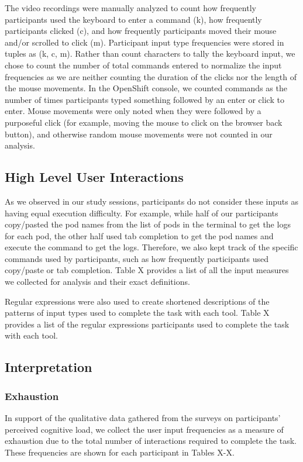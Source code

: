 \documentclass[11pt, oneside]{article}   	%
\begin{document}
The video recordings were manually analyzed to count how frequently participants used the keyboard to enter a command (k), how frequently participants clicked (c), and how frequently participants moved their mouse and/or scrolled to click (m). Participant input type frequencies were stored in tuples as (k, c, m). Rather than count characters to tally the keyboard input, we chose to count the number of total commands entered to normalize the input frequencies as we are neither counting the duration of the clicks nor the length of the mouse movements. In the OpenShift console, we counted commands as the number of times participants typed something followed by an enter or click to enter. Mouse movements were only noted when they were followed by a purposeful click (for example, moving the mouse to click on the browser back button), and otherwise random mouse movements were not counted in our analysis. 

\subsection{High Level User Interactions}
As we observed in our study sessions, participants do not consider these inputs as having equal execution difficulty. For example, while half of our participants copy/pasted the pod names from the list of pods in the terminal to get the logs for each pod, the other half used tab completion to get the pod names and execute the command to get the logs. Therefore, we also kept track of the specific commands used by participants, such as how frequently participants used copy/paste or tab completion. Table X provides a list of all the input measures we collected for analysis and their exact definitions. 

Regular expressions were also used to create shortened descriptions of the patterns of input types used to complete the task with each tool. Table X provides a list of the regular expressions participants used to complete the task with each tool. 

\subsection{Interpretation}
\subsubsection{Exhaustion}
In support of the qualitative data gathered from the surveys on participants' perceived cognitive load, we collect the user input frequencies as a measure of exhaustion due to the total number of interactions required to complete the task. These frequencies are shown for each participant in Tables X-X.
\end{document}
